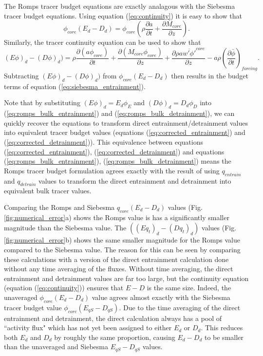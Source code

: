 \documentclass[12pt]{article}
\begin{document}
The Romps tracer budget equations are exactly analagous with the Siebesma 
tracer budget equations.  Using equation (\ref{eq:continuity}) it is easy 
to show that
\begin{equation}
    \phi_{core}(E_d - D_d) =
    \phi_{core} \left(\rho \frac{\partial a}{\partial t}
                    + \frac{\partial M_{core}}{\partial z}\right).
\end{equation}
Similarly, the tracer continuity equation can be used to show that
\begin{equation}
    (E\phi)_d - (D\phi)_d) = 
     \rho \frac{\partial (a \phi_{core})}{\partial t}
   + \frac{\partial (M_{core} \phi_{core})}{\partial z}
   + \frac{\partial \rho a \overline{w' \phi'}^{core}}{\partial z}
   - a \rho \left(\frac{\partial \bar{\phi}}{\partial t}\right)_{forcing}.
\end{equation}
Subtracting $(E\phi)_d - (D\phi)_d)$ from $\phi_{core}(E_d - D_d)$ then 
results in the budget terms of equation (\ref{eq:siebesma_entrainment}).

Note that by substituting $(E \phi)_d = E_d \phi_E$ and 
$(D\phi)_d = D_d \phi_D$ into (\ref{eq:romps_bulk_entrainment}) and 
(\ref{eq:romps_bulk_detrainment}), we can quickly recover the 
equations to transform direct entrainment/detrainment values into 
equivalent tracer budget values (equations (\ref{eq:corrected_entrainment}) 
and (\ref{eq:corrected_detrainment})).  This equivalence between equations 
(\ref{eq:corrected_entrainment}), (\ref{eq:corrected_detrainment}) and 
equations (\ref{eq:romps_bulk_entrainment}), (\ref{eq:romps_bulk_detrainment})
means the Romps tracer budget formulation agrees exactly with the result of 
using $q_{entrain}$ and $q_{detrain}$ values to transform the direct 
entrainment and detrainment into equivalent bulk tracer values.  

Comparing the Romps and Siebesma $q_{core}(E_d - D_d)$ values (Fig. \ref{fig:numerical_error}a) shows the Romps value is has a significantly smaller 
magnitude than the Siebesma value.  The $((Eq_t)_d - (Dq_t)_d)$ values 
(Fig. \ref{fig:numerical_error}b) shows the same smaller magnitude for
the Romps value compared to the Siebesma value.  The reason for this can 
be seen by comparing these calculations with a version of the direct 
entrainment calculation done without any time averaging of the fluxes.  
Without time averaging, the direct entrainment and detrainment values are 
far too large, but the continuity equation (equation (\ref{eq:continuity})) ensures that $E-D$ is the same size.  Indeed, the unaveraged 
$\phi_{core}(E_d - D_d)$ value agrees almost exactly with the Siebesma 
tracer budget value $\phi_{core}(E_{qS} - D_{qS})$.  Due to the time 
averaging of the direct entrainment and detrainment, the direct 
calculation always has a pool of ``activity flux" which has not yet been 
assigned to either $E_d$ or $D_d$.  This reduces both $E_d$ and $D_d$ by 
roughly the same proportion, causing $E_d-D_d$ to be smaller than the 
unaveraged and Siebesma $E_{qS}-D_{qS}$ values.
\end{document}
